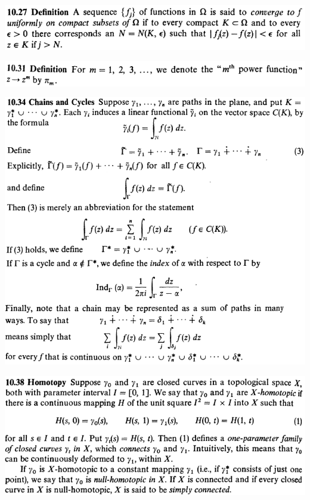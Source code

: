 \documentclass[12pt]{article}
\begin{document}
		\begin{center}
		\includegraphics{d10ponto27}
		\end{center}

		\begin{center}
		\includegraphics{d10ponto31}
		\end{center}

		\begin{center}
		\includegraphics[scale=0.9]{d10ponto34}
		\end{center}

		\begin{center}
		\includegraphics[scale=0.9]{d10ponto38}
		\end{center}
\end{document}
